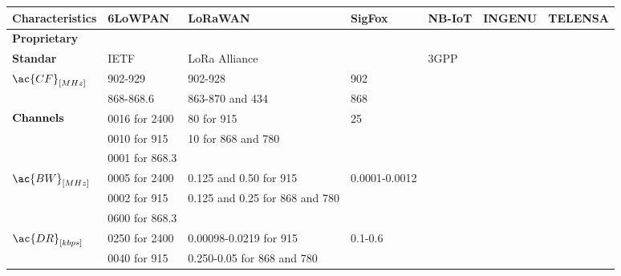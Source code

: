 \begin{table}[!ht]
\scriptsize
	\begin{tabulary}{\textwidth}{L|L|L|L|L|L|L}
	\bf{Characteristics}              & \bf{6LoWPAN}   & \bf{LoRaWAN}                    & \bf{SigFox}   & \bf{NB-IoT} & \textbf{INGENU} & \textbf{TELENSA}\\\hline
	\bf{Proprietary}                  &                &                                 & \ok           &             &                 &                 \\\hline
	\bf{Standar}                      & IETF           & LoRa Alliance                   &               & 3GPP        &                 &                 \\\hline
	  & 902-929        & 902-928                         & 902           &             &                 &                 \\
	\                                 & 868-868.6      & 863-870 and 434                 & 868           &             &                 &                 \\\hline
	   & 0016 for 2400  & 80             for 915          & 25            &             &                 &                 \\
	\                                 & 0010 for 915   & 10             for 868 and 780  &               &             &                 &                 \\
	\                                 & 0001 for 868.3 &                                 &               &             &                 &                 \\\hline
	  & 0005 for 2400  & 0.125 and 0.50 for 915          & 0.0001-0.0012 &             &                 &                 \\
	\                                 & 0002 for 915   & 0.125 and 0.25 for 868 and 780  &               &             &                 &                 \\
	\                                 & 0600 for 868.3 &                                 &               &             &                 &                 \\\hline
	 & 0250 for 2400  & 0.00098-0.0219 for 915          & 0.1-0.6       &             &                 &                 \\
	\                                 & 0040 for 915   & 0.250-0.05     for 868 and 780  &               &             &                 &                 \\

\end{tabulary}
\end{table}
